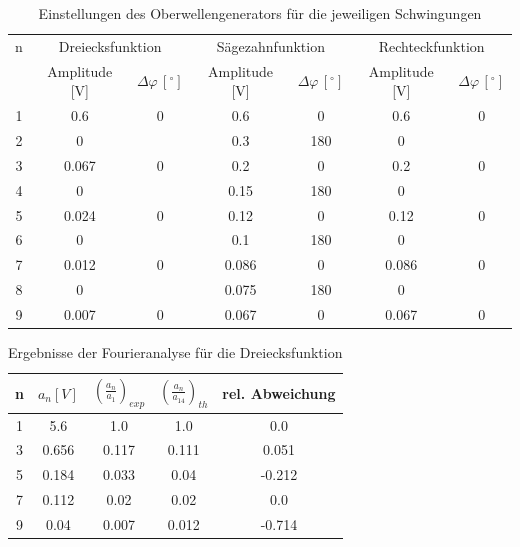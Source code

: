 \documentclass[11pt,ngerman,a4paper]{article}
\begin{document}
\begin{table}
\centering
\begin{tabular}{|c||c|c||c|c||c|c|}
\hline
n & \multicolumn{2}{c||}{Dreiecksfunktion} & \multicolumn{2}{c||}{Sägezahnfunktion} & \multicolumn{2}{c|}{Rechteckfunktion} \\
 & Amplitude [V] & $\Delta \varphi\,[^\circ]$ & Amplitude [V] & $\Delta \varphi\,[^\circ]$ & Amplitude [V] & $\Delta \varphi\,[^\circ]$ \\
\hline
1 & 0.6 & 0 & 0.6 & 0 & 0.6 & 0\\
2 & 0 &  & 0.3 & 180 & 0& \\
3 & 0.067 & 0 & 0.2 & 0 & 0.2 & 0\\
4 & 0 &  & 0.15 & 180 & 0 & \\
5 & 0.024 & 0 & 0.12 & 0 & 0.12 & 0\\
6 & 0 &  & 0.1 & 180 & 0 & \\
7 & 0.012 & 0 & 0.086 & 0 & 0.086 & 0\\
8 & 0 &  & 0.075 & 180 & 0 & \\
9 & 0.007 & 0 & 0.067 & 0 & 0.067 & 0\\
\hline
\end{tabular}
\label{params}
\caption{Einstellungen des Oberwellengenerators für die jeweiligen Schwingungen}
\end{table}
\begin{table}
\centering
\begin{tabular}{|c|c|c|c|c|}
\hline
n & $a_n [V]$ & $(\frac{a_n}{a_1})_{exp}$ & $(\frac{a_n}{a_14})_{th}$ & rel. Abweichung\\
\hline
1&5.6 & 1.0 & 1.0 & 0.0\\
3&0.656 & 0.117 & 0.111 & 0.051\\
5&0.184 & 0.033 & 0.04 & -0.212\\
7&0.112 & 0.02 & 0.02 & 0.0\\
9&0.04 & 0.007 & 0.012 & -0.714\\
\hline
\end{tabular}
\label{hut}
\caption{Ergebnisse der Fourieranalyse für die Dreiecksfunktion}
\end{table}
\end{document}
